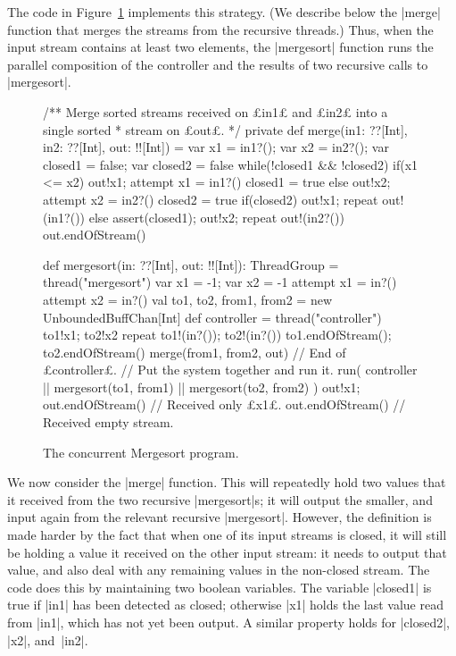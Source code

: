 The code in Figure~\ref{fig:mergesort} implements this strategy.  (We describe
below the |merge| function that merges the streams from the recursive
threads.)  Thus, when the input stream contains at least two elements, the
|mergesort| function runs the parallel composition of the controller and the
results of two recursive calls to |mergesort|.

\begin{figure}
\begin{scala}
  /** Merge sorted streams received on £in1£ and £in2£ into a single sorted
    * stream on £out£. */
  private def merge(in1: ??[Int], in2: ??[Int], out: !![Int]) = {
    var x1 = in1?(); var x2 = in2?(); var closed1 = false; var closed2 = false
    while(!closed1 && !closed2){
      if(x1 <= x2){ out!x1; attempt{ x1 = in1?() }{ closed1 = true } }
      else{ out!x2; attempt{ x2 = in2?() }{ closed2 = true } }
    }
    if(closed2){ out!x1; repeat{ out!(in1?()) } }
    else{ assert(closed1); out!x2; repeat{ out!(in2?()) } }
    out.endOfStream()
  }

  def mergesort(in: ??[Int], out: !![Int]): ThreadGroup = thread("mergesort"){
    var x1 = -1; var x2 = -1
    attempt{ 
      x1 = in?()
      attempt{
        x2 = in?()
        val to1, to2, from1, from2 = new UnboundedBuffChan[Int]
        def controller = thread("controller"){
          to1!x1; to2!x2
          repeat{ to1!(in?()); to2!(in?()) }
          to1.endOfStream(); to2.endOfStream()
          merge(from1, from2, out)
        } // End of £controller£.
        // Put the system together and run it.
        run( controller || mergesort(to1, from1) || mergesort(to2, from2) )
      }{ out!x1; out.endOfStream() } // Received only £x1£.
    }{ out.endOfStream() } // Received empty stream.
  }
\end{scala}
\caption{The concurrent Mergesort program.}
\label{fig:mergesort}
\end{figure}


We now consider the |merge| function.  This will repeatedly hold two values
that it received from the two recursive |mergesort|s; it will output the
smaller, and input again from the relevant recursive |mergesort|.  However,
the definition is made harder by the fact that when one of its input streams
is closed, it will still be holding a value it received on the other input
stream: it needs to output that value, and also deal with any remaining values
in the non-closed stream.  The code does this by maintaining two boolean
variables.  The variable |closed1| is true if |in1| has been detected as
closed; otherwise |x1| holds the last value read from |in1|, which has not yet
been output.  A similar property holds for |closed2|, |x2|, and~|in2|.

